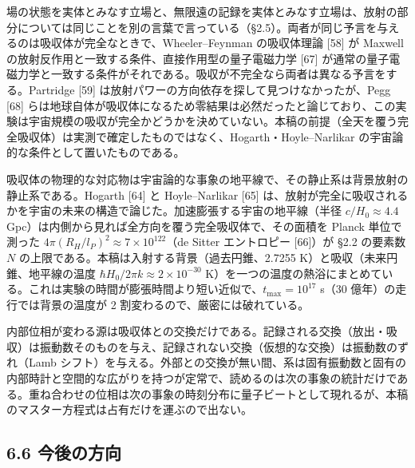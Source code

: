 \documentclass[
  a4paper,
]{ltjsarticle}
\begin{document}
場の状態を実体とみなす立場と、無限遠の記録を実体とみなす立場は、放射の部分については同じことを別の言葉で言っている（§2.5）。両者が同じ予言を与えるのは吸収体が完全なときで、Wheeler--Feynman
の吸収体理論 {[}58{]} が Maxwell
の放射反作用と一致する条件、直接作用型の量子電磁力学 {[}67{]}
が通常の量子電磁力学と一致する条件がそれである。吸収が不完全なら両者は異なる予言をする。Partridge
{[}59{]} は放射パワーの方向依存を探して見つけなかったが、Pegg {[}68{]}
らは地球自体が吸収体になるため零結果は必然だったと論じており、この実験は宇宙規模の吸収が完全かどうかを決めていない。本稿の前提（全天を覆う完全吸収体）は実測で確定したものではなく、Hogarth・Hoyle--Narlikar
の宇宙論的な条件として置いたものである。

吸収体の物理的な対応物は宇宙論的な事象の地平線で、その静止系は背景放射の静止系である。Hogarth
{[}64{]} と Hoyle--Narlikar {[}65{]}
は、放射が完全に吸収されるかを宇宙の未来の構造で論じた。加速膨張する宇宙の地平線（半径
\(c/H_0\approx4.4\)
Gpc）は内側から見れば全方向を覆う完全吸収体で、その面積を Planck
単位で測った \(4\pi(R_H/l_P)^2\approx7\times10^{122}\)（de Sitter
エントロピー {[}66{]}）が §2.2 の要素数 \(N\)
の上限である。本稿は入射する背景（過去円錐、2.7255
K）と吸収（未来円錐、地平線の温度
\(\hbar H_0/2\pi k\approx2\times10^{-30}\)
K）を一つの温度の熱浴にまとめている。これは実験の時間が膨張時間より短い近似で、\(t_{\max}=10^{17}\)
s（30 億年）の走行では背景の温度が 2 割変わるので、厳密には破れている。

内部位相が変わる源は吸収体との交換だけである。記録される交換（放出・吸収）は振動数そのものを与え、記録されない交換（仮想的な交換）は振動数のずれ（Lamb
シフト）を与える。外部との交換が無い間、系は固有振動数と固有の内部時計と空間的な広がりを持つが定常で、読めるのは次の事象の統計だけである。重ね合わせの位相は次の事象の時刻分布に量子ビートとして現れるが、本稿のマスター方程式は占有だけを運ぶので出ない。

\subsection{6.6 今後の方向}\label{ux4ecaux5f8cux306eux65b9ux5411}
\end{document}
